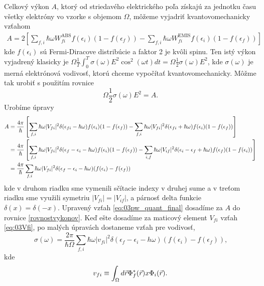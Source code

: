 Celkový výkon $A$, ktorý od striedavého elektrického poľa získajú za jednotku času všetky  elektróny vo vzorke s objemom $\Omega$,
môžeme vyjadriť kvantovomechanicky vzťahom
\begin{align}
\label{eq:03pw_quant}
A=2\left[
\sum_{f,i}\hbar\omega W_{fi}^{\mathrm{ABS}}f(\epsilon_i)(1-f(\epsilon_f))-\sum_{f,i}\hbar\omega W_{fi}^{\mathrm{EMIS}}f(\epsilon_i)(1-f(\epsilon_f))
\right] \
\end{align}
kde $f(\epsilon_i)$ sú Fermi-Diracove distribúcie a faktor 2 je kvôli spinu. Ten istý výkon vyjadrený
klasicky je $\Omega\frac{1}{T}\int_0^T\sigma(\omega)E^2\cos^2(\omega t)dt=\Omega\frac{1}{2}\sigma(\omega)E^2$, kde
$\sigma(\omega)$ je merná elektrónová vodivosť, ktorú chceme vypočítať kvantovomechanicky. Môžme tak urobiť s použitím rovnice
\begin{equation}
\label{rovnostvykonov}
\Omega\frac{1}{2}\sigma(\omega)E^2 = A \text{.}
\end{equation}
Urobíme úpravy
\begin{align}
\label{eq:03pw_quant_final}
\notag
A&=\frac{4\pi}{\hbar}
\left[
\sum_{f,i}\hbar\omega|V_{fi}|^2\delta(\epsilon_{fi}-\hbar\omega)f(\epsilon_i)(1-f(\epsilon_f))-\sum_{f,i}\hbar\omega|V_{fi}|^2\delta(\epsilon_{fi}+\hbar\omega) f(\epsilon_i)(1-f(\epsilon_f))
\right]\\ \notag
&=\frac{4\pi}{\hbar}
\left[\sum_{f,i}\hbar\omega|V_{fi}|^2\delta(\epsilon_f-\epsilon_i-\hbar\omega)f(\epsilon_i)(1-f(\epsilon_f))-\sum_{i,f}\hbar\omega|V_{if}|^2\delta(\epsilon_i-\epsilon_f+\hbar\omega) f(\epsilon_f)(1-f(\epsilon_i))
\right]\\
&=\frac{4\pi}{\hbar}\sum_{f,i}\hbar\omega|V_{fi}|^2\delta(\epsilon_f-\epsilon_i-\hbar\omega)(f(\epsilon_i)-f(\epsilon_f))
\end{align}
kde v druhom riadku sme vymenili sčítacie indexy v druhej sume a v treťom riadku sme využili symetriu $|V_{fi}|=|V_{if}|$, a párnosť delta funkcie $\delta(x)=\delta(-x)$.
Upravený vzťah \eqref{eq:03pw_quant_final} dosadíme za $A$ do rovnice \eqref{rovnostvykonov}. Keď ešte dosadíme za maticový element $V_{fi}$  vzťah \eqref{eq:03Vfi}, po malých úpravách dostaneme vzťah pre vodivosť,
\begin{equation}
\label{eq:03sigma}
\sigma(\omega)=\frac{2\pi}{\hbar \Omega}\sum_{f,i}\hbar\omega|v_{fi}|^2\delta(\epsilon_f-\epsilon_i-h\omega)(f(\epsilon_i)-f(\epsilon_f)) \text{,}
\end{equation}
kde
\begin{equation}
\label{eq:03sigma matic}
v_{fi} \equiv \int_{\Omega}d\vec{r} \Phi_f^*(\vec{r})x\Phi_i(\vec{r}) \text{.}
\end{equation}
